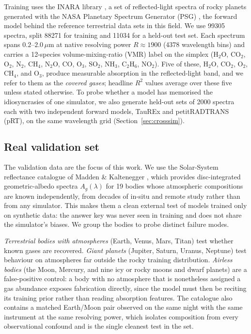 \documentclass[11pt,twocolumn]{article}
\newcommand{\citep}[1]{\cite{#1}}
\newcommand{\um}{\,$\mu$m}
\newcommand{\co}{$\mathrm{CO_2}$}
\newcommand{\ot}{$\mathrm{O_2}$}
\newcommand{\oth}{$\mathrm{O_3}$}
\newcommand{\ch}{$\mathrm{CH_4}$}
\newcommand{\wat}{$\mathrm{H_2O}$}
\newcommand{\ntwo}{$\mathrm{N_2}$}
\begin{document}
Training uses the INARA library \citep{zorzan2025}, a set of reflected-light
spectra of rocky planets generated with the NASA Planetary Spectrum Generator
(PSG) \citep{villanueva2018}, the forward model behind the reference terrestrial
data sets in this field. We use \num{99305} spectra, split \num{88271} for
training and \num{11034} for a held-out test set. Each spectrum spans
$0.2$--$2.0$\um{} at native resolving power $R\!\approx\!1900$ (\num{4378}
wavelength bins) and carries a 12-species volume-mixing-ratio (VMR) label on the
simplex (\wat, \co, \ot, \ntwo, \ch, $\mathrm{N_2O}$, CO, \oth,
$\mathrm{SO_2}$, $\mathrm{NH_3}$, $\mathrm{C_2H_6}$, $\mathrm{NO_2}$). Five of
these, \wat, \co, \ot, \ch, and \oth, produce measurable absorption in the
reflected-light band, and we refer to them as the \emph{covered gases}; headline
$R^2$ values average over these five unless stated otherwise. To probe whether a
model has memorised the idiosyncrasies of one simulator, we also generate
held-out sets of \num{2000} spectra each with two independent forward models,
TauREx and petitRADTRANS (pRT), on the same wavelength grid
(Section~\ref{sec:crosssim}).

\subsection{Real validation set}
\label{sec:realdata_data}

The validation data are the focus of this work. We use the Solar-System
reflectance catalogue of Madden \& Kaltenegger \citep{madden2018}, which provides
disc-integrated geometric-albedo spectra $A_g(\lambda)$ for 19 bodies whose
atmospheric compositions are known independently, from decades of in-situ and
remote study rather than from any simulator. This makes them a clean external
test of models trained only on synthetic data: the answer key was never seen in
training and does not share the simulator's biases. We group the bodies to probe
distinct failure modes.

\emph{Terrestrial bodies with atmospheres} (Earth, Venus, Mars, Titan) test
whether known gases are recovered. \emph{Giant planets} (Jupiter, Saturn,
Uranus, Neptune) test behaviour on atmospheres far outside the rocky training
distribution. \emph{Airless bodies} (the Moon, Mercury, and nine icy or rocky
moons and dwarf planets) are a false-positive control: a body with no atmosphere
that is nonetheless assigned a gas abundance exposes fabrication directly, since
the model must then be reciting its training prior rather than reading absorption
features. The catalogue also contains a matched Earth/Moon pair observed on the
same night with the same instrument at the same resolving power, which isolates
composition from every observational confound and is the single cleanest test in
the set.
\end{document}
